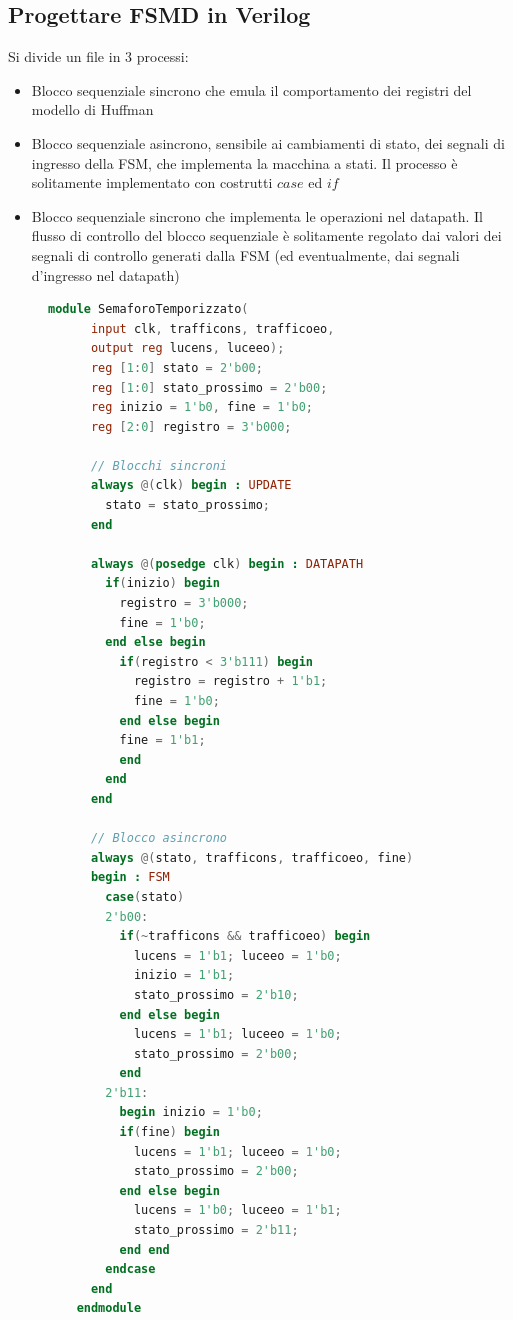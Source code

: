 \documentclass[a4paper]{article}
\theoremstyle{break}
\theoremstyle{break}
\theoremstyle{break}
\theoremstyle{break}
\begin{document}
\subsection{Progettare FSMD in Verilog}
Si divide un file in 3 processi:
\begin{itemize}
  \item Blocco sequenziale sincrono che emula il comportamento dei registri
  del modello di Huffman
  \item Blocco sequenziale asincrono, sensibile ai cambiamenti di stato, dei
  segnali di ingresso della FSM, che implementa la macchina a stati. Il
  processo è solitamente implementato con costrutti \( case \) ed \( if \) 
  \item Blocco sequenziale sincrono che implementa le operazioni nel
  datapath. Il flusso di controllo del blocco sequenziale è solitamente
  regolato dai valori dei segnali di controllo generati dalla FSM (ed
  eventualmente, dai segnali d’ingresso nel datapath)
\end{itemize}
\begin{figure}[H]
  \begin{example}
    \begin{lstlisting}[language=Verilog]
    module SemaforoTemporizzato(
      input clk, trafficons, trafficoeo,
      output reg lucens, luceeo);
      reg [1:0] stato = 2'b00;
      reg [1:0] stato_prossimo = 2'b00;
      reg inizio = 1'b0, fine = 1'b0;
      reg [2:0] registro = 3'b000;

      // Blocchi sincroni
      always @(clk) begin : UPDATE
        stato = stato_prossimo;
      end

      always @(posedge clk) begin : DATAPATH
        if(inizio) begin
          registro = 3'b000;
          fine = 1'b0;
        end else begin
          if(registro < 3'b111) begin
            registro = registro + 1'b1;
            fine = 1'b0;
          end else begin
          fine = 1'b1;
          end
        end
      end

      // Blocco asincrono
      always @(stato, trafficons, trafficoeo, fine)
      begin : FSM
        case(stato)
        2'b00:
          if(~trafficons && trafficoeo) begin
            lucens = 1'b1; luceeo = 1'b0;
            inizio = 1'b1;
            stato_prossimo = 2'b10;
          end else begin
            lucens = 1'b1; luceeo = 1'b0;
            stato_prossimo = 2'b00;
          end
        2'b11:
          begin inizio = 1'b0;
          if(fine) begin
            lucens = 1'b1; luceeo = 1'b0;
            stato_prossimo = 2'b00;
          end else begin
            lucens = 1'b0; luceeo = 1'b1;
            stato_prossimo = 2'b11;
          end end
        endcase
      end
    endmodule
    \end{lstlisting}
  \end{example}
\end{figure}
\end{document}
